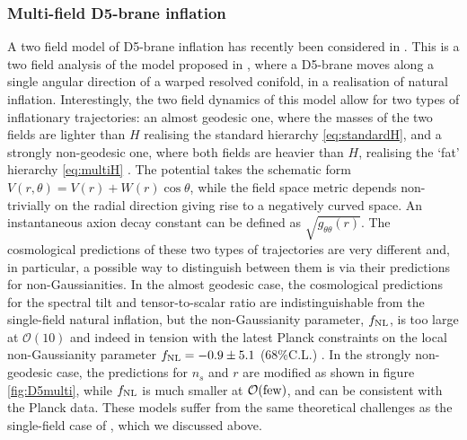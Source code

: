 \subsubsection*{Multi-field D5-brane inflation}

A two field model of D5-brane inflation has recently been considered in \cite{Chakraborty:2019dfh}. This is a two field analysis of the model proposed in \cite{Kenton:2014gma}, where a D5-brane moves along a single angular direction of a warped resolved conifold, in a realisation  of natural inflation.  Interestingly, the two field dynamics of this model allow for two types of inflationary trajectories: an almost  geodesic one, where the masses of the two fields are lighter than $H$ realising the standard hierarchy \eqref{eq:standardH}, and a strongly non-geodesic one, where both fields are heavier than $H$, realising the `fat' hierarchy \eqref{eq:multiH} \cite{Chakraborty:2019dfh}. The potential takes the schematic form $V(r,\theta)=V(r)+W(r)\cos\theta$, while the field space metric depends non-trivially on the radial direction giving rise to a negatively curved space. An instantaneous axion decay constant can be defined as $\sqrt{g_{\theta\theta}(r)}$. The cosmological predictions of these two types of trajectories are very different and, in particular, a possible way to distinguish between them is via their predictions for non-Gaussianities. In the almost geodesic case, the cosmological predictions for the spectral tilt and tensor-to-scalar ratio are indistinguishable from the single-field natural inflation, but the non-Gaussianity parameter, $f_{\rm NL}$, is too large at ${\mathcal O}(10)$ and indeed in tension with the latest Planck constraints on the local non-Gaussianity parameter $f_{\rm NL} =-0.9\pm 5.1$ (68\%C.L.) \cite{Planck:2019kim}. In the strongly non-geodesic case, the predictions for $n_s$ and $r$ are modified as shown in figure \ref{fig:D5multi}, while $f_{\rm NL}$ is much smaller at  ${\mathcal O}({\rm few})$, and can be consistent with the Planck data.  These models suffer from the same theoretical challenges as the single-field case of \cite{Kenton:2014gma}, which we discussed above.

